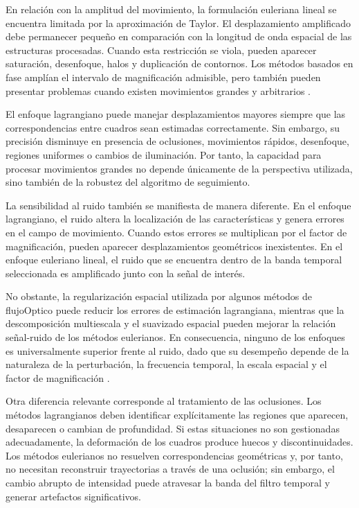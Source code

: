 En relación con la amplitud del movimiento, la formulación euleriana lineal se encuentra limitada por la aproximación de Taylor. El desplazamiento amplificado debe permanecer pequeño en comparación con la longitud de onda espacial de las estructuras procesadas. Cuando esta restricción se viola, pueden aparecer saturación, desenfoque, halos y duplicación de contornos. Los métodos basados en fase amplían el intervalo de magnificación admisible, pero también pueden presentar problemas cuando existen movimientos grandes y arbitrarios \cite{wadhwa2013phase}.

El enfoque lagrangiano puede manejar desplazamientos mayores siempre que las correspondencias entre cuadros sean estimadas correctamente. Sin embargo, su precisión disminuye en presencia de oclusiones, movimientos rápidos, desenfoque, regiones uniformes o cambios de iluminación. Por tanto, la capacidad para procesar movimientos grandes no depende únicamente de la perspectiva utilizada, sino también de la robustez del algoritmo de seguimiento.

La sensibilidad al ruido también se manifiesta de manera diferente. En el enfoque lagrangiano, el ruido altera la localización de las características y genera errores en el campo de movimiento. Cuando estos errores se multiplican por el factor de magnificación, pueden aparecer desplazamientos geométricos inexistentes. En el enfoque euleriano lineal, el ruido que se encuentra dentro de la banda temporal seleccionada es amplificado junto con la señal de interés.

No obstante, la regularización espacial utilizada por algunos métodos de \gls{flujoOptico} puede reducir los errores de estimación lagrangiana, mientras que la descomposición multiescala y el suavizado espacial pueden mejorar la relación señal-ruido de los métodos eulerianos. En consecuencia, ninguno de los enfoques es universalmente superior frente al ruido, dado que su desempeño depende de la naturaleza de la perturbación, la frecuencia temporal, la escala espacial y el factor de magnificación \cite{wu2012eulerian}.

Otra diferencia relevante corresponde al tratamiento de las oclusiones. Los métodos lagrangianos deben identificar explícitamente las regiones que aparecen, desaparecen o cambian de profundidad. Si estas situaciones no son gestionadas adecuadamente, la deformación de los cuadros produce huecos y discontinuidades. Los métodos eulerianos no resuelven correspondencias geométricas y, por tanto, no necesitan reconstruir trayectorias a través de una oclusión; sin embargo, el cambio abrupto de intensidad puede atravesar la banda del filtro temporal y generar artefactos significativos.

